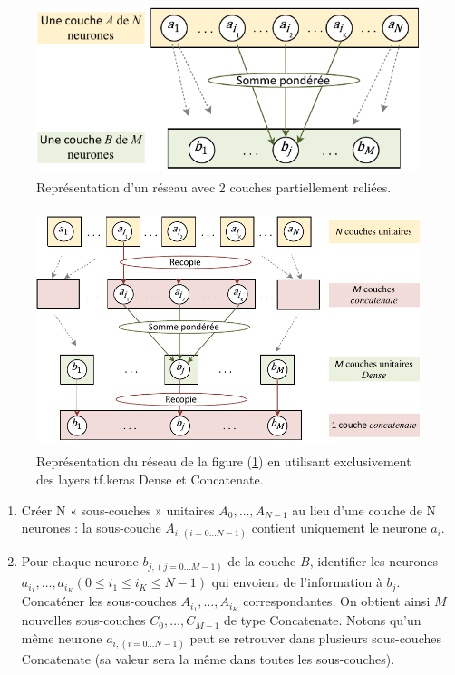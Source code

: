 \begin{itemize}[label=$\square$]
\begin{itemize}
\begin{figure}[H]
	\centerline{
		\includegraphics[height=5cm]{images_these/RN_2_couches_partielles.pdf}}
	\caption[Représentation d'un réseau avec 2 couches partiellement reliées.]{Représentation d'un réseau avec 2 couches partiellement reliées.}
	\label{RN_2_couches_partielles}
\end{figure}

\begin{figure}[H]
	\centerline{
		\includegraphics[height=7cm]{images_these/RN_Dense_et_Concatenate.pdf}}
	\caption[Représentation du réseau de la figure (\ref{RN_2_couches_partielles}) en utilisant exclusivement des layers tf.keras Dense et Concatenate.]{Représentation du réseau de la figure (\ref{RN_2_couches_partielles}) en utilisant exclusivement des layers tf.keras Dense et Concatenate.}
	\label{Dense_et_Concatenate}
\end{figure}
\begin{enumerate}
\item	Créer N « sous-couches » unitaires $A_0,\dots,A_{N-1}$ au lieu d'une couche de N neurones : la sous-couche $A_{i,(i=0 \dots N-1)}$ contient uniquement le neurone $a_i$.
	
\item Pour chaque neurone $b_{j,(j=0 \dots M-1)}$ de la couche $B$, identifier les neurones $a_{i_1 },\dots,a_{i_K}  (0\leq i_1\leq i_K \leq N-1)$ qui envoient de l'information à $b_j$. Concaténer les sous-couches $A_{i_1 }, \dots, A_{i_K }$ correspondantes. On obtient ainsi $M$ nouvelles sous-couches $C_0, \dots, C_{M-1}$ de type Concatenate. Notons qu'un même neurone $a_{i, (i=0 \dots N-1)}$  peut se retrouver dans plusieurs sous-couches Concatenate (sa valeur sera la même dans toutes les sous-couches).


\end{enumerate}
\end{itemize}
\end{itemize}
